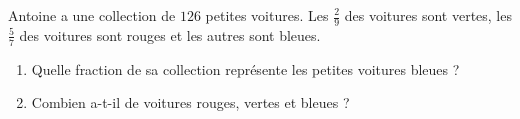 
\begin{exercice}\label{exosmath-0894}

    Antoine a une collection de $126$ petites voitures. Les \( \frac{ 2 }{ 9 }\) des voitures sont vertes, les \( \frac{ 5 }{ 7 }\) des voitures sont rouges et les autres sont bleues.
    \begin{enumerate}
        \item
 Quelle fraction de sa collection représente les petites voitures bleues ?
 \item
 Combien a-t-il de voitures rouges, vertes et bleues ?
    \end{enumerate}

\end{exercice}
